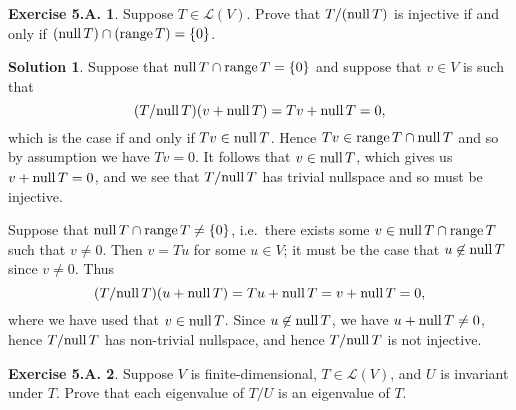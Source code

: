 \documentclass[12pt]{article}
\theoremstyle{definition}
\theoremstyle{exercise}
\newtheorem{exercise}{Exercise 5.A.}
\theoremstyle{solution}
\newtheorem*{solution}{Solution}
\newcommand{\lmap}{\mathcal{L}}
\newcommand{\Null}{\text{null\,}}
\newcommand{\Range}{\text{range\,}}
\begin{document}
\begin{exercise}
\label{ex:34}
    Suppose \( T \in \lmap(V) \). Prove that \( T/(\Null T) \) is injective if and only if \( (\Null T) \cap (\Range T) = \{ 0 \} \).
\end{exercise}

\begin{solution}
    Suppose that \( \Null T \cap \Range T = \{ 0 \} \) and suppose that \( v \in V \) is such that
    \[
        (T/\Null T)(v + \Null T) = Tv + \Null T = 0,
    \]
    which is the case if and only if \( Tv \in \Null T \). Hence \( Tv \in \Range T \cap \Null T \) and so by assumption we have \( Tv = 0 \). It follows that \( v \in \Null T \), which gives us \( v + \Null T = 0 \), and we see that \( T/\Null T \) has trivial nullspace and so must be injective.

    Suppose that \( \Null T \cap \Range T \neq \{ 0 \} \), i.e.\ there exists some \( v \in \Null T \cap \Range T \) such that \( v \neq 0 \). Then \( v = Tu \) for some \( u \in V \); it must be the case that \( u \not\in \Null T \) since \( v \neq 0 \). Thus
    \[
        (T/\Null T)(u + \Null T) = Tu + \Null T = v + \Null T = 0,
    \]
    where we have used that \( v \in \Null T \). Since \( u \not\in \Null T \), we have \( u + \Null T \neq 0 \), hence \( T/\Null T \) has non-trivial nullspace, and hence \( T/\Null T \) is not injective.
\end{solution}

\begin{exercise}
\label{ex:35}
    Suppose \( V \) is finite-dimensional, \( T \in \lmap(V) \), and \( U \) is invariant under \( T \). Prove that each eigenvalue of \( T/U \) is an eigenvalue of \( T \).

\end{exercise}
\end{document}
